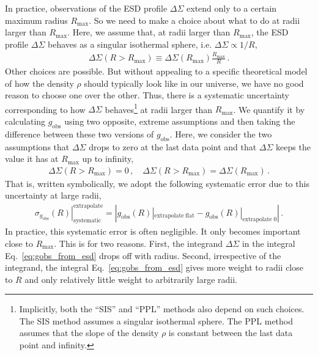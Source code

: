 \documentclass[a4paper,11pt]{article}
\begin{document}
In practice, observations of the ESD profile $\Delta \Sigma$ extend only to a certain maximum radius $R_{\mathrm{max}}$.
So we need to make a choice about what to do at radii larger than $R_{\mathrm{max}}$.
Here, we assume that, at radii larger than $R_{\mathrm{max}}$, the ESD profile $\Delta \Sigma$ behaves as a singular isothermal sphere, i.e. $\Delta \Sigma \propto 1/R$,
\begin{align}
 \Delta \Sigma(R > R_{\mathrm{max}}) \equiv \Delta \Sigma(R_{\mathrm{max}}) \frac{R_{\mathrm{max}}}{R} \,.
\end{align}
Other choices are possible.
But without appealing to a specific theoretical model of how the density $\rho$ should typically look like in our universe, we have no good reason to choose one over the other.
Thus, there is a systematic uncertainty corresponding to how $\Delta \Sigma$ behaves\footnote{
  Implicitly, both the ``SIS'' and ``PPL'' methods also depend on such choices.
  The SIS method assumes a singular isothermal sphere.
  The PPL method assumes that the slope of the density $\rho$ is constant between the last data point and infinity.
} at radii larger than $R_{\mathrm{max}}$.
We quantify it by calculating $g_{\mathrm{obs}}$ using two opposite, extreme assumptions and then taking the difference between these two versions of $g_{\mathrm{obs}}$.
Here, we consider the two assumptions that $\Delta \Sigma$ drops to zero at the last data point and that $\Delta \Sigma$ keeps the value it has at $R_{\mathrm{max}}$ up to infinity,
\begin{align}
 \Delta \Sigma(R > R_{\mathrm{max}}) = 0 \,, \quad
 \Delta \Sigma(R > R_{\mathrm{max}}) = \Delta \Sigma(R_{\mathrm{max}}) \,.
\end{align}
That is, written symbolically, we adopt the following systematic error due to this uncertainty at large radii,
\begin{align}
 \label{eq:syst_err_gobs_extrapolate}
 \left.\sigma_{g_{\mathrm{obs}}}(R)\right|^{\mathrm{extrapolate}}_{\mathrm{systematic}} = \left| g_{\mathrm{obs}}(R) |_{\mathrm{extrapolate\;flat}} - g_{\mathrm{obs}}(R) |_{\mathrm{extrapolate\;0}} \right| \,.
\end{align}
In practice, this systematic error is often negligible.
It only becomes important close to $R_{\mathrm{max}}$.
This is for two reasons.
First, the integrand $\Delta \Sigma$ in the integral Eq.~\eqref{eq:gobs_from_esd} drops off with radius.
Second, irrespective of the integrand, the integral Eq.~\eqref{eq:gobs_from_esd} gives more weight to radii close to $R$ and only relatively little weight to arbitrarily large radii.
\end{document}
